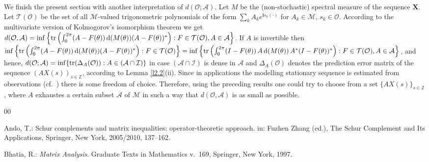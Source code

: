 \documentclass{amsart}
\begin{document}
{We finish the present section with another interpretation of $d({\mathcal O};{\mathcal A})$. Let $M$ be the (non-stochastic) spectral measure of the sequence $\mathbf X$. Let ${\mathcal T}({\mathcal O})$ be the set of all $\mathcal M$-valued trigonometric  polynomials of the form $\sum_k A_k e^{{\mathbf i} s_k ( \cdot )}$ for $A_k \in \mathcal M$, $s_k \in \mathcal O$. According to the multivariate version of Kolmogorov's isomorphism theorem we get $d({\mathcal O},{\mathcal A}) = \inf \left\{ {\rm tr} \left( \int_0^{2 \pi} (A-F(\theta)) \, {\mathrm d}(M(\theta))(A-F(\theta))^* \right) : F \in {\mathcal T}({\mathcal O}), A \in {\mathcal A} \right\}$. If $A$ is invertible then $\inf \left\{ {\rm tr} \left( \int_0^{2 \pi} (A-F(\theta)) \, {\mathrm d}(M(\theta))(A-F(\theta))^* \right) : F \in {\mathcal T}({\mathcal O}) \right\} = \inf \left\{ {\rm tr} \left( \int_0^{2 \pi} (I-F(\theta)) \, A\, {\mathrm d}(M(\theta)) \, A^* (I-F(\theta))^* \right) : F \in {\mathcal T}({\mathcal O}), A \in {\mathcal A} \right\}$, and hence, $d({\mathcal O} ; {\mathcal A}) = \inf \{ {\rm tr}(\Delta_A({\mathcal O})) : A \in ({\mathcal A} \cap {\mathcal I} ) \}$ in case $ ({\mathcal A} \cap {\mathcal I})$ is dense in $\mathcal A$ and $\Delta_A({\mathcal O})$ denotes the prediction error matrix of the sequence $(A X(s))_{s \in {\mathbb Z}}$, according to Lemma \ref{l2.2}(ii). Since in applications the modelling stationary sequence is estimated from observations (cf.~\cite[Chapter 16]{Br}) there is some freedom of choice. Therefore, using the preceding results  one could try to choose from a set $\{ A X(s) \}_{s \in {\mathbb Z}}$, where $A$ exhaustes a certain subset $\mathcal A$ of $\mathcal M$ in such a way that $d({\mathcal O},{\mathcal A})$ is as small as possible. 




\begin{thebibliography}{00}


 Ando, T.:
 Schur complements and matrix inequalities: operator-theoretic approach.
 in: Fuzhen Zhang (ed.), The Schur Complement and Its Applications, Springer, New York, 2005/2010, 137--162.

 Bhatia, R.:
 {\it Matrix Analysis}.
 Graduate Texts in Mathematics v.~169, Springer, New York, 1997.
 

\end{thebibliography}}
\end{document}
